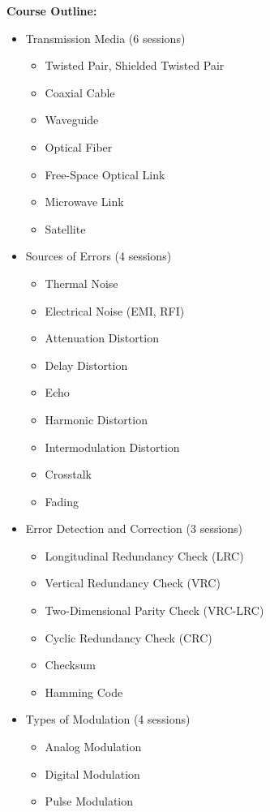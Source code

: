 \documentclass[12pt]{article}
\begin{document}
\textbf{Course Outline:}
\begin{itemize}
    \item Transmission Media (6 sessions)
    \begin{itemize}
        \item Twisted Pair, Shielded Twisted Pair
        \item Coaxial Cable
        \item Waveguide
        \item Optical Fiber
        \item Free-Space Optical Link
        \item Microwave Link
        \item Satellite
    \end{itemize}
    
    \item Sources of Errors (4 sessions)
    \begin{itemize}
        \item Thermal Noise
        \item Electrical Noise (EMI, RFI)
        \item Attenuation Distortion
        \item Delay Distortion
        \item Echo
        \item Harmonic Distortion
        \item Intermodulation Distortion
        \item Crosstalk
        \item Fading
    \end{itemize}
    
    \item Error Detection and Correction (3 sessions)
    \begin{itemize}
        \item Longitudinal Redundancy Check (LRC)
        \item Vertical Redundancy Check (VRC)
        \item Two-Dimensional Parity Check (VRC-LRC)
        \item Cyclic Redundancy Check (CRC)
        \item Checksum
        \item Hamming Code
    \end{itemize}
    
    \item Types of Modulation (4 sessions)
    \begin{itemize}
        \item Analog Modulation
        \item Digital Modulation
        \item Pulse Modulation
    \end{itemize}
    

\end{itemize}
\end{document}
